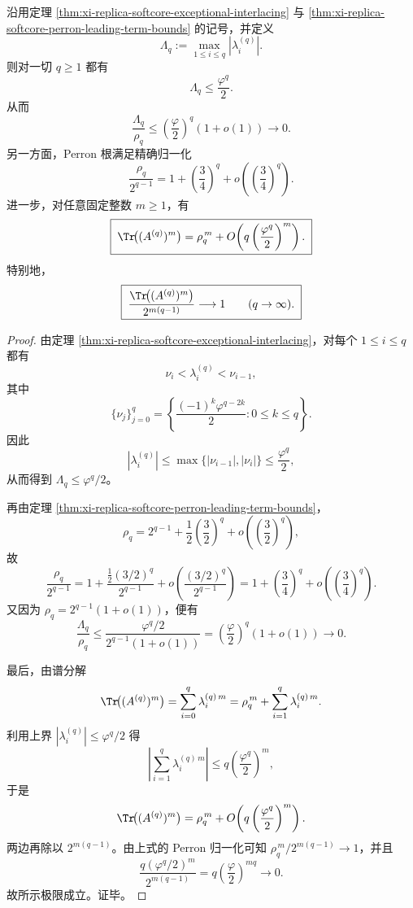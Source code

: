 \begin{theorem}\label{thm:xi-replica-softcore-rankone-spectral-collapse}
沿用定理 \ref{thm:xi-replica-softcore-exceptional-interlacing} 与
\ref{thm:xi-replica-softcore-perron-leading-term-bounds} 的记号，并定义
\[
\Lambda_q:=\max_{1\le i\le q}|\lambda_i^{(q)}|.
\]
则对一切 \(q\ge 1\) 都有
\[
\boxed{\;
\Lambda_q\le \frac{\varphi^q}{2}.\;}
\]
从而
\[
\boxed{\;
\frac{\Lambda_q}{\rho_q}
\le
\left(\frac{\varphi}{2}\right)^q(1+o(1))
\longrightarrow 0.\;}
\]
另一方面，Perron 根满足精确归一化
\[
\boxed{\;
\frac{\rho_q}{2^{q-1}}
=
1+\left(\frac34\right)^q
+o\!\left(\left(\frac34\right)^q\right).\;}
\]
进一步，对任意固定整数 \(m\ge 1\)，有
\[
\boxed{\;
\Tr\!\bigl((A^{(q)})^m\bigr)
=
\rho_q^{\,m}
+O\!\left(q\left(\frac{\varphi^q}{2}\right)^m\right).\;}
\]
特别地，
\[
\boxed{\;
\frac{\Tr\!\bigl((A^{(q)})^m\bigr)}{2^{m(q-1)}}\longrightarrow 1
\qquad(q\to\infty).\;}
\]
\end{theorem}
\begin{proof}
由定理 \ref{thm:xi-replica-softcore-exceptional-interlacing}，对每个 \(1\le i\le q\) 都有
\[
\nu_i<\lambda_i^{(q)}<\nu_{i-1},
\]
其中
\[
\{\nu_j\}_{j=0}^{q}
=
\left\{\frac{(-1)^k\varphi^{q-2k}}{2}:0\le k\le q\right\}.
\]
因此
\[
|\lambda_i^{(q)}|
\le
\max\{|\nu_{i-1}|,|\nu_i|\}
\le
\frac{\varphi^q}{2},
\]
从而得到 \(\Lambda_q\le \varphi^q/2\)。

再由定理 \ref{thm:xi-replica-softcore-perron-leading-term-bounds}，
\[
\rho_q
=
2^{q-1}
+\frac12\left(\frac32\right)^q
+o\!\left(\left(\frac32\right)^q\right),
\]
故
\[
\frac{\rho_q}{2^{q-1}}
=
1+\frac{\frac12(3/2)^q}{2^{q-1}}
+o\!\left(\frac{(3/2)^q}{2^{q-1}}\right)
=
1+\left(\frac34\right)^q+o\!\left(\left(\frac34\right)^q\right).
\]
又因为 \(\rho_q=2^{q-1}(1+o(1))\)，便有
\[
\frac{\Lambda_q}{\rho_q}
\le
\frac{\varphi^q/2}{2^{q-1}(1+o(1))}
=
\left(\frac{\varphi}{2}\right)^q(1+o(1))
\longrightarrow 0.
\]

最后，由谱分解
\[
\Tr\!\bigl((A^{(q)})^m\bigr)
=
\sum_{i=0}^{q}\lambda_i^{(q)\,m}
=
\rho_q^{\,m}+\sum_{i=1}^{q}\lambda_i^{(q)\,m}.
\]
利用上界 \(|\lambda_i^{(q)}|\le \varphi^q/2\) 得
\[
\left|\sum_{i=1}^{q}\lambda_i^{(q)\,m}\right|
\le
q\left(\frac{\varphi^q}{2}\right)^m,
\]
于是
\[
\Tr\!\bigl((A^{(q)})^m\bigr)
=
\rho_q^{\,m}
+O\!\left(q\left(\frac{\varphi^q}{2}\right)^m\right).
\]
两边再除以 \(2^{m(q-1)}\)。由上式的 Perron 归一化可知
\(
\rho_q^{\,m}/2^{m(q-1)}\to 1
\)，并且
\[
\frac{q(\varphi^q/2)^m}{2^{m(q-1)}}
=
q\left(\frac{\varphi}{2}\right)^{mq}
\longrightarrow 0.
\]
故所示极限成立。证毕。
\end{proof}

\endinput
